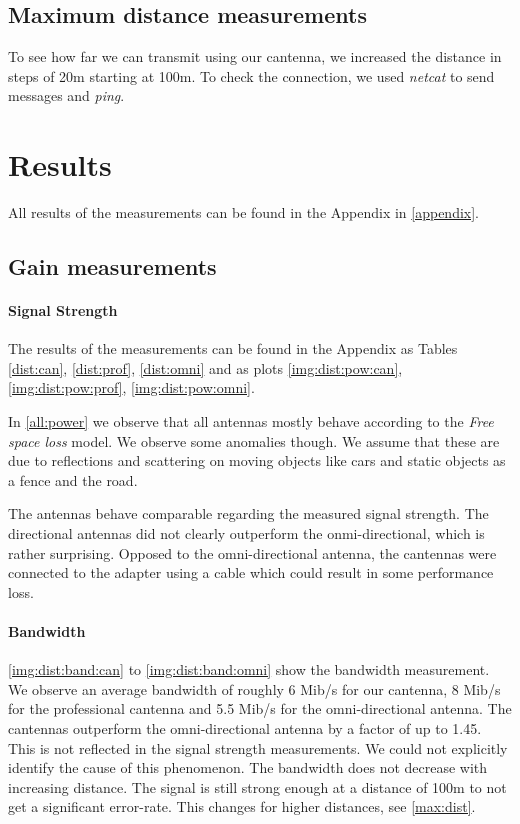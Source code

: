 \documentclass[12pt,a4paper]{article}
\begin{document}
		\subsection{Maximum distance measurements}
			To see how far we can transmit using our cantenna, we increased the distance in steps of 20m starting at 100m. To check the connection, we used \emph{netcat} to send messages and \emph{ping}.
		
\section{Results}
	All results of the measurements can be found in the Appendix in \autoref{appendix}.
	\subsection{Gain measurements}
		
		\paragraph{Signal Strength} The results of the measurements can be found in the Appendix as Tables \autoref{dist:can}, \autoref{dist:prof}, \autoref{dist:omni} and as plots \autoref{img:dist:pow:can}, \autoref{img:dist:pow:prof}, \autoref{img:dist:pow:omni}.
		
		In \autoref{all:power} we observe that all antennas mostly behave according to the \emph{Free space loss} model.
		We observe some anomalies though. We assume that these are due to reflections and scattering on moving objects like cars and static objects as a fence and the road.
		
		The antennas behave comparable regarding the measured signal strength. The directional antennas did not clearly outperform the onmi-directional, which is rather surprising. Opposed to the omni-directional antenna, the cantennas were connected to the adapter using a cable which could result in some performance loss.
		
		\paragraph{Bandwidth} \autoref{img:dist:band:can} to \autoref{img:dist:band:omni} show the bandwidth measurement. We observe an average bandwidth of roughly 6 Mib/s for our cantenna, 8 Mib/s for the professional cantenna and 5.5 Mib/s for the omni-directional antenna.
		The cantennas outperform the omni-directional antenna by a factor of up to 1.45. This is not reflected in the signal strength measurements. We could not explicitly identify the cause of this phenomenon.
		The bandwidth does not decrease with increasing distance. The signal is still strong enough at a distance of 100m to not get a significant error-rate. This changes for higher distances, see \autoref{max:dist}.
		
\end{document}
